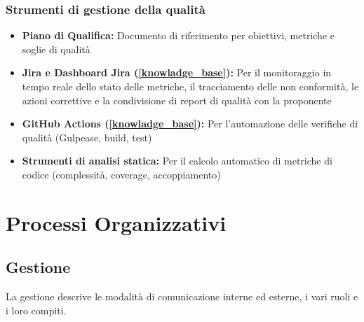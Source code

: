 \documentclass[a4paper,12pt]{article}
\begin{document}
\subsubsection{Strumenti di gestione della qualità}\label{strumenti_gestione_qualita}
\begin{itemize}
    \item \textbf{Piano di Qualifica:} Documento di riferimento per obiettivi, metriche e soglie di qualità
    \item \textbf{Jira e Dashboard Jira (\ref{knowladge_base}):} Per il monitoraggio in tempo reale dello stato delle metriche, 
    il tracciamento delle non conformità, le azioni correttive e la condivisione di report di qualità con la proponente
    \item \textbf{GitHub Actions (\ref{knowladge_base}):} Per l'automazione delle verifiche di qualità (Gulpease, build, test)
    \item \textbf{Strumenti di analisi statica:} Per il calcolo automatico di metriche di codice (complessità, coverage, accoppiamento)
\end{itemize}

\section{Processi Organizzativi}
\subsection{Gestione} \label{gestione_processi_organizzativi}
La gestione descrive le modalità di comunicazione interne ed esterne, i vari ruoli e i loro compiti. 
\end{document}
